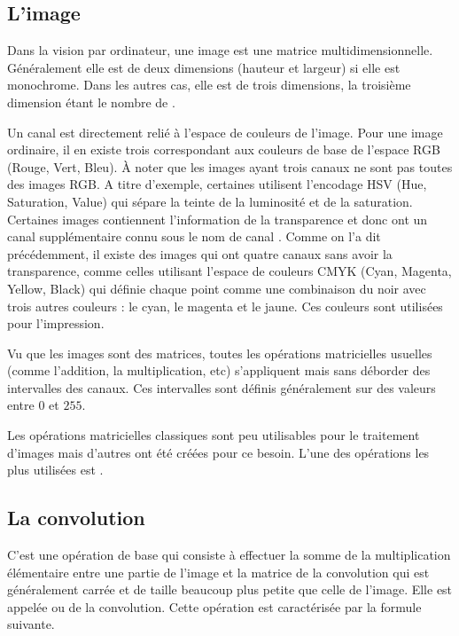 \subsection{L'image}

Dans la vision par ordinateur, une image est une matrice multidimensionnelle.
Généralement elle est de deux dimensions (hauteur et largeur) si
elle est monochrome. Dans les autres cas, elle est de trois dimensions, la troisième
dimension étant le nombre de .

Un canal est directement relié à l'espace de couleurs de l'image.
Pour une image ordinaire, il en existe trois correspondant aux couleurs de base
de l'espace RGB (Rouge, Vert, Bleu). \`A noter que les images ayant trois
canaux ne sont pas toutes des images RGB. A titre d'exemple, certaines utilisent
l'encodage HSV (Hue, Saturation, Value) qui sépare la teinte de la luminosité et
de la saturation. Certaines images contiennent l'information de la transparence
et donc ont un canal supplémentaire connu sous le nom de canal .
Comme on l'a dit précédemment, il existe des images qui ont quatre canaux sans
avoir la transparence, comme celles utilisant l'espace de couleurs CMYK
(Cyan, Magenta, Yellow, Black) qui définie chaque point comme une
combinaison du noir avec trois autres couleurs : le cyan, le magenta et le jaune.
Ces couleurs sont utilisées pour l'impression.

Vu que les images sont des matrices, toutes les opérations matricielles usuelles
(comme l'addition, la multiplication, etc) s'appliquent mais sans déborder des
intervalles des canaux. Ces intervalles sont définis généralement sur des
valeurs entre $0$ et $255$.

Les opérations matricielles classiques sont peu utilisables pour le traitement
d'images mais d'autres ont été créées pour ce besoin. L'une des opérations les
plus utilisées est .

\subsection{La convolution}

C'est une opération de base qui consiste à effectuer la somme de la multiplication
élémentaire entre une partie de l'image et la matrice de la convolution qui est
généralement carrée et de taille beaucoup plus petite que celle de l'image.
Elle est appelée  ou  de la convolution. Cette
opération est caractérisée par la formule suivante.

